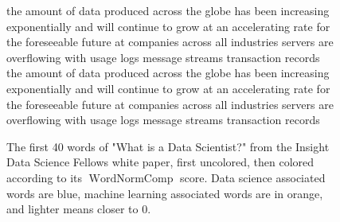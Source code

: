 \documentclass[12pt]{article}
\DeclareMathOperator{\WNp}{WordNormComp}
\begin{document}
\begin{figure}[H]
the amount of data produced across the globe has been increasing
exponentially and will continue to grow at an accelerating rate for the foreseeable future at companies across all industries servers are overflowing with usage logs message streams transaction records\\

{\color{b1}the} {\color{o1}amount} {\color{b1}of} {\color{b2}data} {\color{w}produced} {\color{b1}across} {\color{b1}the} {\color{b1}globe} {\color{b1}has} {\color{b2}been} {\color{w}increasing} {\color{w}exponentially} {\color{b1}and} {\color{b1}will} {\color{w}continue} {\color{b1}to} {\color{b2}grow} {\color{b1}at} {\color{b1}an} {\color{w}accelerating} {\color{o3}rate} {\color{b1}for} {\color{b1}the} {\color{w}foreseeable} {\color{b2}future} {\color{b1}at} {\color{b3}companies} {\color{b1}across} {\color{b2}all} {\color{w}industries} {\color{w}servers} {\color{b1}are} {\color{w}overflowing} {\color{b1}with} {\color{b1}usage} {\color{w}logs} {\color{o2}message} {\color{o1}streams} {\color{b1}transaction} {\color{w}records}
\caption{\label{fig:InsightColored} The first 40 words of "What is a Data Scientist?" from the Insight Data Science Fellows white paper, first uncolored, then colored according to its $\WNp$ score. Data science associated words are blue, machine learning associated words are in orange, and lighter means closer to 0.}
\end{figure}
\end{document}
